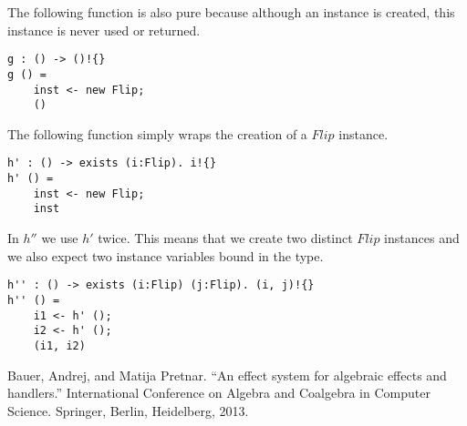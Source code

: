 \documentclass[12pt]{article}
\begin{document}
The following function is also pure because although an instance is created, this instance is never used or returned.
\begin{verbatim}
g : () -> ()!{}
g () =
	inst <- new Flip;
	()
\end{verbatim}

The following function simply wraps the creation of a $Flip$ instance.
\begin{verbatim}
h' : () -> exists (i:Flip). i!{}
h' () =
	inst <- new Flip;
	inst
\end{verbatim}

In $h''$ we use $h'$ twice. This means that we create two distinct $Flip$ instances and we also expect two instance variables bound in the type.
\begin{verbatim}
h'' : () -> exists (i:Flip) (j:Flip). (i, j)!{}
h'' () =
	i1 <- h' ();
	i2 <- h' ();
	(i1, i2)
\end{verbatim}

\begin{thebibliography}{9}
Bauer, Andrej, and Matija Pretnar. ``An effect system for algebraic effects and handlers.'' International Conference on Algebra and Coalgebra in Computer Science. Springer, Berlin, Heidelberg, 2013.
\end{thebibliography}
\end{document}
